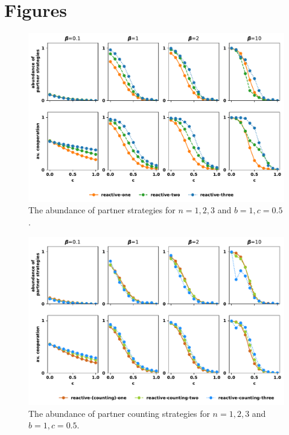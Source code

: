 \documentclass{article}
\theoremstyle{definition}
\begin{document}
\section{Figures}


\begin{figure}[!htbp]
  \includegraphics[width=\textwidth]{figures/abundance_of_partner_strategies.pdf}
  \caption{The abundance of partner strategies for $n=1,2,3$ and $b=1, c=0.5$.}
\end{figure}

\begin{figure}[!htbp]
  \includegraphics[width=\textwidth]{figures/abundance_of_partner_counting_strategies.pdf}
  \caption{The abundance of partner counting strategies for $n=1,2,3$ and $b=1, c=0.5$.}
\end{figure}
\end{document}
